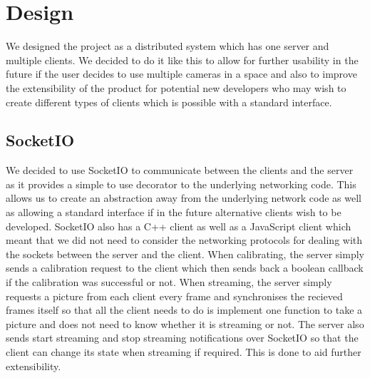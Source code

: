 \documentclass{article}
\begin{document}
\section{Design}
We designed the project as a distributed system which has one server and multiple clients. We decided to do it like this to allow for further usability in the future if the user decides to use multiple cameras in a space and also to improve the extensibility of the product for potential new developers who may wish to create different types of clients which is possible with a standard interface.
\subsection{SocketIO}
We decided to use SocketIO to communicate between the clients and the server as it provides a simple to use decorator to the underlying networking code. This allows us to create an abstraction away from the underlying network code as well as allowing a standard interface if in the future alternative clients wish to be developed. SocketIO also has a C++ client as well as a JavaScript client which meant that we did not need to consider the networking protocols for dealing with the sockets between the server and the client. When calibrating, the server simply sends a calibration request to the client which then sends back a boolean callback if the calibration was successful or not. When streaming, the server simply requests a picture from each client every frame and synchronises the recieved frames itself so that all the client needs to do is implement one function to take a picture and does not need to know whether it is streaming or not. The server also sends start streaming and stop streaming notifications over SocketIO so that the client can change its state when streaming if required. This is done to aid further extensibility.
\end{document}
